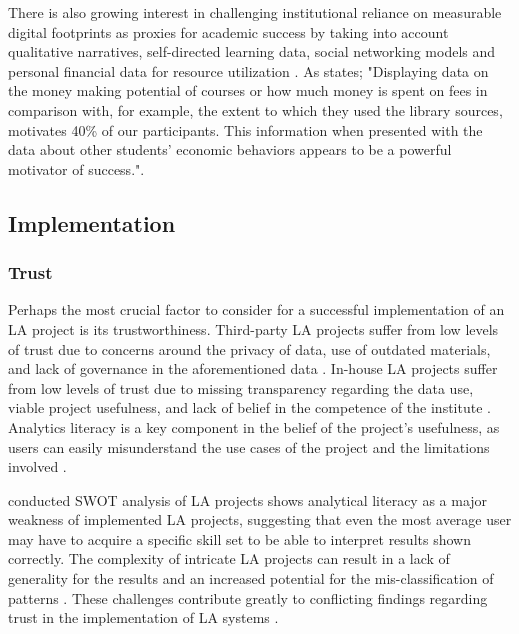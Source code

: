 \documentclass{l4proj}
\begin{document}
There is also growing interest in challenging institutional reliance on measurable digital footprints as proxies for academic success by taking into account qualitative narratives, self-directed learning data, social networking models and personal financial data for resource utilization \citep{Joseph-Richard2023WhichPerspective}. As \citet{Joseph-Richard2023WhichPerspective} states; "Displaying data on the money making potential of courses or how much money is spent on fees in comparison with, for example, the extent to which they used the library sources, motivates 40\% of our participants. This information when presented with the data about other students’ economic behaviors appears to be a powerful motivator of success.".

\subsection{Implementation}
\subsubsection{Trust}
\hfill

Perhaps the most crucial factor to consider for a successful implementation of an LA project is its trustworthiness. Third-party LA projects suffer from low levels of trust due to concerns around the privacy of data, use of outdated materials, and lack of governance in the aforementioned data \citep{ShannanAlzahrani2023DoStudy}. In-house LA projects suffer from low levels of trust due to missing transparency regarding the data use, viable project usefulness, and lack of belief in the competence of the institute \citep{ShannanAlzahrani2023DoStudy}. Analytics literacy is a key component in the belief of the project's usefulness, as users can easily misunderstand the use cases of the project and the limitations involved \citep{Feldstein_2017}. 

\citet{Papamitsiou2014InternationalEvidence} conducted SWOT analysis of LA projects shows analytical literacy as a major weakness of implemented LA projects, suggesting that even the most average user may have to acquire a specific skill set to be able to interpret results shown correctly. The complexity of intricate LA projects can result in a lack of generality for the results and an increased potential for the mis-classification of patterns \citep{Papamitsiou2014InternationalEvidence}. These challenges contribute greatly to conflicting findings regarding trust in the implementation of LA systems \citep{Papamitsiou2014InternationalEvidence}.
\end{document}
